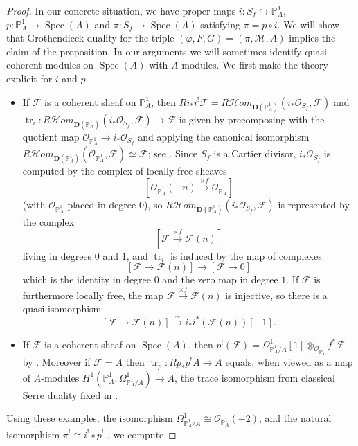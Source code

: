 \documentclass{article} %
\numberwithin{equation}{section}
\DeclareMathOperator{\tr}{tr}
\DeclareMathOperator{\Spec}{Spec}
\renewcommand{\P}{\mathbb{P}}
\newcommand{\cO}{\mathcal{O}}
\newcommand{\cM}{\mathcal{M}}
\newcommand{\ShHom}{\mathcal{H}\!\mathit{om}}
\begin{document}
\begin{proof}
    In our concrete situation, we have proper maps $i\colon S_f\hookrightarrow \P^1_A$, $p\colon \P^1_A \rightarrow \Spec(A)$ and $\pi\colon S_f\rightarrow \Spec(A)$ satisfying $\pi = p \circ i$.
    We will show that Grothendieck duality for the triple $(\varphi, F,G) = (\pi, \cM, A)$ implies the claim of the proposition. 
    In our arguments we will sometimes identify quasi-coherent modules on $\Spec(A)$ with $A$-modules.
    We first make the theory explicit for $i$ and $p$. 
    \begin{itemize}
        \item If $\mathcal{F}$ is a coherent sheaf on $\P^1_A$, then $Ri_* i^! \mathcal{F} = R\ShHom_{\mathbf{D}(\P^1_A)}(i_*\cO_{S_f},\mathcal{F})$ and $\tr_i\colon R\ShHom_{\mathbf{D}(\P^1_A)}(i_*\cO_{S_f},\mathcal{F})\rightarrow \mathcal{F}$ is given by precomposing with the quotient map $\cO_{\P^1_A}\rightarrow i_*\cO_{S_f}$ and applying the canonical isomorphism $R\ShHom_{\mathbf{D}(\P^1_A)}(\cO_{\P^1_A}, \mathcal{F}) \simeq \mathcal{F}$; see \cite[Lemma 3.4.3(2) and page 31]{conrad-grothendieckduality}.
        Since $S_f$ is a Cartier divisor, $i_*\cO_{S_f}$ is computed by the complex of locally free sheaves 
        \[ [ \cO_{\P^1_A}(-n) \xrightarrow{\times f} \cO_{\P^1_A} ] \]
        (with $\cO_{\P^1_A}$ placed in degree $0$), so $R\ShHom_{\mathbf{D}(\P^1_A)}(i_*\cO_{S_f},\mathcal{F})$ is represented by the complex 
        \[ [ \mathcal{F} \xrightarrow{\times f} \mathcal{F}(n) ] \]
        living in degrees $0$ and $1$, and $\tr_i$ is induced by the map of complexes 
        \[ [ \mathcal{F} \rightarrow \mathcal{F}(n) ] \rightarrow [ \mathcal{F} \to 0 ] \] which is the identity in degree $0$ and the zero map in degree $1$. 
        If $\mathcal{F}$ is furthermore locally free, the map $\mathcal{F}\xrightarrow{\times f} \mathcal{F}(n)$ is injective, so there is a quasi-isomorphism
        \[  [ \mathcal{F} \rightarrow \mathcal{F}(n) ] \overset{\sim}{\to} i_* i^*(\mathcal{F}(n))[-1]. \]
        \item If $\mathcal{F}$ is a coherent sheaf on $\Spec(A)$, then $p^!(\mathcal{F}) = \Omega^1_{\P^1_A/A}[1] \otimes_{\cO_{\P^1_A}} f^*\mathcal{F}$ by \cite[Lemma 3.4.3(3)]{conrad-grothendieckduality}.
        Moreover if $\mathcal{F} = A$ then $\tr_p\colon Rp_* p^! A \rightarrow A$ equals, when viewed as a map of $A$-modules $H^1(\P^1_A,\Omega_{\P^1_A/A}^1)\rightarrow A$, the trace isomorphism from classical Serre duality fixed in \cite[Section 2.3]{conrad-grothendieckduality}. 
    \end{itemize}
    Using these examples, the isomorphism $\Omega_{\P^1_A / A}^1 \cong \cO_{\P^1_A}(-2)$, and the natural isomorphism $\pi^! \cong i^! \circ p^!$ \cite[Equation (3.3.14)]{conrad-grothendieckduality}, we compute

\end{proof}
\end{document}
